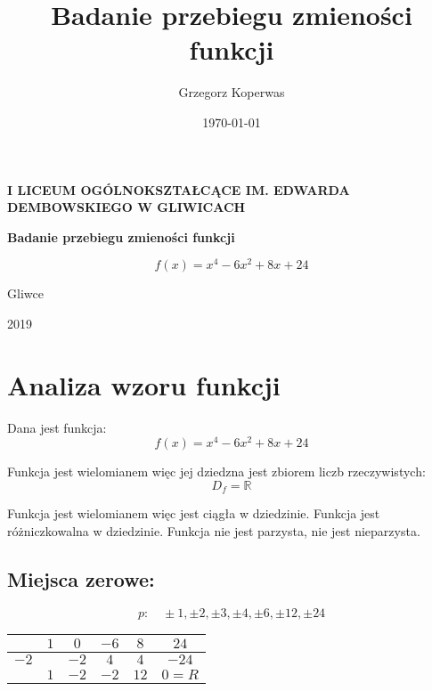 \documentclass[a4paper,12pt]{article}
\title{Badanie przebiegu zmieności funkcji}
\author{Grzegorz Koperwas}
\date{\today}
\begin{document}
\begin{titlepage}
	\begin{center}
		\Large{\textbf{I LICEUM OGÓLNOKSZTAŁCĄCE IM. EDWARDA DEMBOWSKIEGO W GLIWICACH}}

		\vspace{3cm}

		\theauthor

		\vspace{2.5cm}

		\textbf{Badanie przebiegu zmieności funkcji}

		\[f \left( x \right) = x^4 - 6x^2 + 8x + 24 \]

		\vfill

		Gliwce
		\vspace{0.5cm}

		\titlerule
		\vspace{0.6cm}

		2019

	\end{center}

\end{titlepage}

\section{Analiza wzoru funkcji}

Dana jest funkcja:
\[ f \left( x \right) = x^4  - 6x^2 + 8x + 24 \]

Funkcja jest wielomianem więc jej dziedzna jest zbiorem liczb rzeczywistych:
\[D_f = \mathbb{R} \]

Funkcja jest wielomianem więc jest ciągła w dziedzinie. Funkcja jest różniczkowalna w dziedzinie. Funkcja nie jest parzysta, nie jest nieparzysta.
\subsection{Miejsca zerowe:}
\[ p: \quad \pm 1, \pm 2, \pm 3, \pm 4, \pm 6, \pm 12, \pm 24\]

\begin{center}
	
\begin{tabular}{l|c|c|c|c|c}
                           & $1$ & $0$  & $-6$ & $8$  & $24$    \\ \hline

		$-2$ &     & $-2$ & $4$  & $4$  & $-24$   \\ \hline

                           & $1$ & $-2$ & $-2$ & $12$ & $0 = R$ \\  

\end{tabular}
\end{center}
\end{document}

